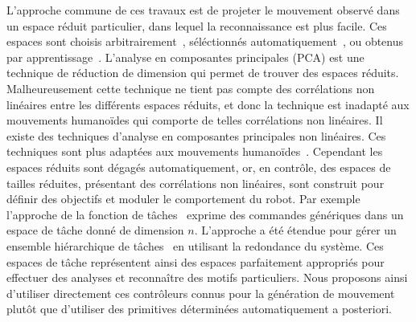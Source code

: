 L'approche commune de ces travaux est de projeter le mouvement observé dans un espace réduit
particulier, dans lequel la reconnaissance est plus facile. 
Ces espaces sont choisis arbitrairement~\cite{nakaoka07}, 
séléctionnés automatiquement~\cite{muhlig09}, ou obtenus par apprentissage~\cite{peters08}. 
L'analyse en composantes principales (PCA) est une technique de réduction de dimension qui 
permet de trouver des espaces réduits. 
Malheureusement cette technique ne tient pas compte des corrélations non linéaires
entre les différents espaces réduits, et donc la technique est inadapté aux mouvements humanoïdes
qui comporte de telles corrélations non linéaires.
Il existe des techniques d'analyse en composantes principales non linéaires. Ces 
techniques sont plus adaptées aux mouvements humanoïdes~\cite{chalodhorn09}.
Cependant les espaces réduits sont dégagés automatiquement, or, en contrôle,
des espaces de tailles réduites, présentant des corrélations non linéaires, sont construit pour définir des objectifs et
moduler le comportement du robot.
Par exemple l'approche de la fonction de t\^aches~\cite{samson91} 
exprime des commandes génériques dans un espace de t\^ache donné de dimension $n$.
L'approche a été étendue pour gérer un ensemble hiérarchique de t\^aches~\cite{siciliano91, nakamura87}
en utilisant la redondance du système.
Ces espaces de t\^ache représentent ainsi des espaces parfaitement appropriés pour
effectuer des analyses et reconnaître des motifs particuliers.
Nous proposons ainsi d'utiliser directement ces contrôleurs connus pour la génération
de mouvement plutôt que d'utiliser des primitives déterminées automatiquement a posteriori.
\medskip


